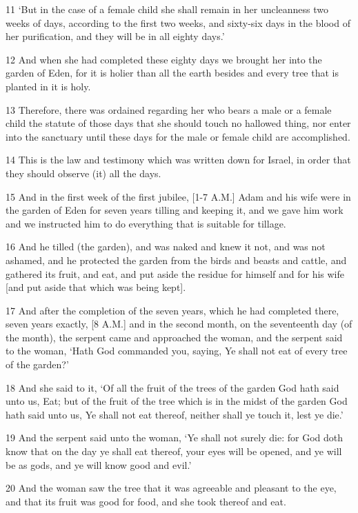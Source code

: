 \par 11 ‘But in the case of a female child she shall remain in her uncleanness two weeks of days, according to the first two weeks, and sixty-six days in the blood of her purification, and they will be in all eighty days.’
\par 12 And when she had completed these eighty days we brought her into the garden of Eden, for it is holier than all the earth besides and every tree that is planted in it is holy.
\par 13 Therefore, there was ordained regarding her who bears a male or a female child the statute of those days that she should touch no hallowed thing, nor enter into the sanctuary until these days for the male or female child are accomplished.
\par 14 This is the law and testimony which was written down for Israel, in order that they should observe (it) all the days.
\par 15 And in the first week of the first jubilee, [1-7 A.M.] Adam and his wife were in the garden of Eden for seven years tilling and keeping it, and we gave him work and we instructed him to do everything that is suitable for tillage.
\par 16 And he tilled (the garden), and was naked and knew it not, and was not ashamed, and he protected the garden from the birds and beasts and cattle, and gathered its fruit, and eat, and put aside the residue for himself and for his wife [and put aside that which was being kept].
\par 17 And after the completion of the seven years, which he had completed there, seven years exactly, [8 A.M.] and in the second month, on the seventeenth day (of the month), the serpent came and approached the woman, and the serpent said to the woman, ‘Hath God commanded you, saying, Ye shall not eat of every tree of the garden?’
\par 18 And she said to it, ‘Of all the fruit of the trees of the garden God hath said unto us, Eat; but of the fruit of the tree which is in the midst of the garden God hath said unto us, Ye shall not eat thereof, neither shall ye touch it, lest ye die.’
\par 19 And the serpent said unto the woman, ‘Ye shall not surely die: for God doth know that on the day ye shall eat thereof, your eyes will be opened, and ye will be as gods, and ye will know good and evil.’
\par 20 And the woman saw the tree that it was agreeable and pleasant to the eye, and that its fruit was good for food, and she took thereof and eat.
